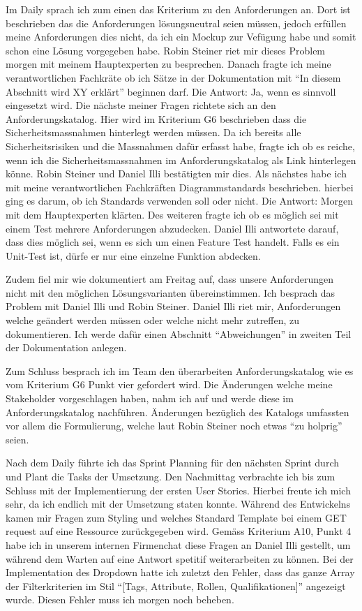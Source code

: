 Im Daily sprach ich zum einen das Kriterium zu den Anforderungen an. Dort ist beschrieben das die Anforderungen lösungsneutral seien müssen, jedoch
erfüllen meine Anforderungen dies nicht, da ich ein Mockup zur Vefügung habe und somit schon eine Lösung vorgegeben habe. Robin Steiner
riet mir dieses Problem morgen mit meinem Hauptexperten zu besprechen. Danach fragte ich meine verantwortlichen Fachkräte ob ich Sätze in der Dokumentation
mit ``In diesem Abschnitt wird XY erklärt'' beginnen darf. Die Antwort: Ja, wenn es sinnvoll eingesetzt wird. Die nächste meiner Fragen richtete sich an den 
Anforderungskatalog. Hier wird im Kriterium G6 beschrieben dass die Sicherheitsmassnahmen hinterlegt werden müssen.
Da ich bereits alle Sicherheitsrisiken und die Massnahmen dafür erfasst habe, fragte ich ob es reiche, wenn ich die Sicherheitsmassnahmen im Anforderungskatalog als
Link hinterlegen könne. Robin Steiner und Daniel Illi bestätigten mir dies. Als nächstes habe ich mit meine verantwortlichen Fachkräften Diagrammstandards beschrieben.
hierbei ging es darum, ob ich Standards verwenden soll oder nicht. Die Antwort: Morgen mit dem Hauptexperten klärten.
Des weiteren fragte ich ob es möglich sei mit einem Test mehrere Anforderungen abzudecken. Daniel Illi antwortete darauf, dass
dies möglich sei, wenn es sich um einen Feature Test handelt. Falls es ein Unit-Test ist, dürfe er nur eine einzelne Funktion abdecken. 

Zudem fiel mir wie dokumentiert am Freitag auf, dass unsere Anforderungen nicht mit den möglichen Lösungsvarianten
übereinstimmen. Ich besprach das Problem mit Daniel Illi und Robin Steiner. Daniel Illi riet mir, Anforderungen welche geändert werden müssen oder
welche nicht mehr zutreffen, zu dokumentieren. Ich werde dafür einen Abschnitt ``Abweichungen'' in zweiten Teil der Dokumentation anlegen. 

Zum Schluss besprach ich im Team den überarbeiten Anforderungskatalog wie es vom Kriterium G6 Punkt vier gefordert wird. Die Änderungen welche meine Stakeholder 
vorgeschlagen haben, nahm ich auf und werde diese im Anforderungskatalog nachführen. Änderungen bezüglich des Katalogs umfassten vor allem die Formulierung,
welche laut Robin Steiner noch etwas ``zu holprig'' seien.

Nach dem Daily führte ich das Sprint Planning für den nächsten Sprint durch und Plant die Tasks der Umsetzung.
Den Nachmittag verbrachte ich bis zum Schluss mit der Implementierung der ersten User Stories. Hierbei freute ich mich sehr, da 
ich endlich mit der Umsetzung staten konnte. Während des Entwickelns kamen mir Fragen zum Styling und welches Standard Template bei einem 
GET request auf eine Ressource zurückgegeben wird. Gemäss Kriterium A10, Punkt 4 habe ich in unserem internen Firmenchat diese Fragen an Daniel Illi gestellt,
um während dem Warten auf eine Antwort spetitif weiterarbeiten zu können. Bei der Implementation des Dropdown hatte ich zuletzt den Fehler, 
dass das ganze Array der Filterkriterien im Stil ``[Tags, Attribute, Rollen, Qualifikationen]'' angezeigt wurde. Diesen Fehler muss ich morgen noch beheben.

